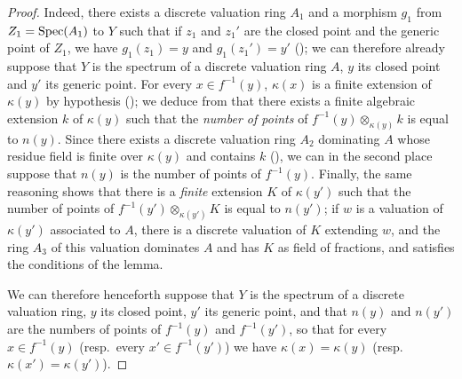 \begin{proof}
Indeed, there exists a discrete valuation ring $A_1$ and a morphism $g_1$ from $Z_1=\operatorname{Spec}(A_1)$ to $Y$ such that if $z_1$ and $z_1'$ are the closed point and the generic point of $Z_1$,
we have $g_1(z_1)=y$ and $g_1(z_1')=y'$ (); we can therefore already suppose that $Y$ is the spectrum of a discrete valuation ring $A$, $y$ its closed point and $y'$ its generic point.
For every $x\in f^{-1}(y)$, $\kappa(x)$ is a finite extension of $\kappa(y)$ by hypothesis (); we deduce from  that there exists a finite algebraic extension $k$ of $\kappa(y)$ such that the \emph{number of points} of $f^{-1}(y)\otimes_{\kappa(y)}k$ is equal to $n(y)$.
Since there exists a discrete valuation ring $A_2$ dominating $A$ whose residue field is finite over $\kappa(y)$ and contains $k$ (), we can in the second place suppose that $n(y)$ is the number of points of $f^{-1}(y)$.
Finally, the same reasoning shows that there is a \emph{finite} extension $K$ of $\kappa(y')$ such that the number of points of $f^{-1}(y')\otimes_{\kappa(y')}K$ is equal to $n(y')$; if $w$ is a valuation of $\kappa(y')$ associated to $A$, there is a discrete valuation of $K$ extending $w$, and the ring $A_3$ of this valuation dominates $A$ and has $K$ as field of fractions, and satisfies the conditions of the lemma.

We can therefore henceforth suppose that $Y$ is the spectrum of a discrete valuation ring, $y$ its closed point, $y'$ its generic point, and that $n(y)$ and $n(y')$ are the numbers of points of $f^{-1}(y)$ and $f^{-1}(y')$, so that for every $x\in f^{-1}(y)$ (resp.\ every $x'\in f^{-1}(y')$) we have $\kappa(x)=\kappa(y)$ (resp.\ $\kappa(x')=\kappa(y')$).


\end{proof}
